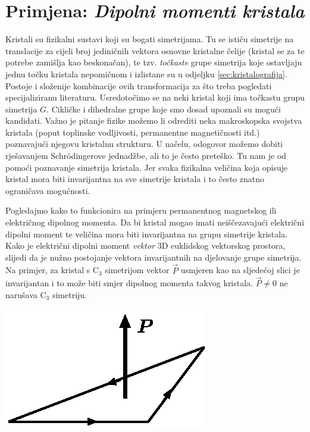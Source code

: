 \section{Primjena: \emph{Dipolni momenti kristala}}
\label{sec:dipolni}

Kristali su fizikalni sustavi koji su bogati simetrijama. Tu se
ističu simetrije na translacije za cijeli broj jediničnih vektora
osnovne kristalne čelije (kristal se za te potrebe zamišlja kao beskonačan),
te tzv. \emph{točkaste} grupe simetrija koje ostavljaju jednu točku
kristala nepomičnom i izlistane su u odjeljku \ref{sec:kristalografija}.
Postoje i složenije kombinacije ovih transformacija za što treba pogledati
specijaliziranu literaturu. Usredotočimo se na neki kristal koji
ima točkastu grupu simetrija $G$. Cikličke i dihedralne grupe koje smo
dosad upoznali su mogući kandidati. Važno je pitanje fizike možemo li odrediti
neka makroskopska svojstva kristala (poput toplinske vodljivosti,
permanentne magnetičnosti itd.) poznavajući njegovu kristalnu strukturu.
U načelu, odogovor možemo dobiti rješavanjem Schr\"{o}dingerove jednadžbe,
ali to je često preteško. Tu nam je od pomoći poznavanje simetrija
kristala. Jer svaka fizikalna veličina koja opisuje kristal mora
biti invarijantna na sve simetrije kristala i to često znatno
ograničava mogućnosti.

Pogledajmo kako to funkcionira na primjeru
permanentnog magnetskog ili električnog dipolnog
momenta. Da bi kristal mogao imati neiščezavajući
električni dipolni moment
te veličina mora biti invarijantna na grupu simetrije
kristala.
Kako je električni dipolni moment \emph{vektor} 3D euklidskog vektorskog prostora,
slijedi da je nužno postojanje vektora invarijantnih na djelovanje grupe simetrija.
Na primjer, za kristal s C$_3$ simetrijom vektor $\vec{P}$ usmjeren
kao na sljedećoj slici je invarijantan i
to može biti smjer dipolnog momenta takvog kristala. $\vec{P}\neq 0$
ne narušava C$_3$ simetriju.

\centerline{\includegraphics[scale=1.0]{pics/dipol.eps}}

